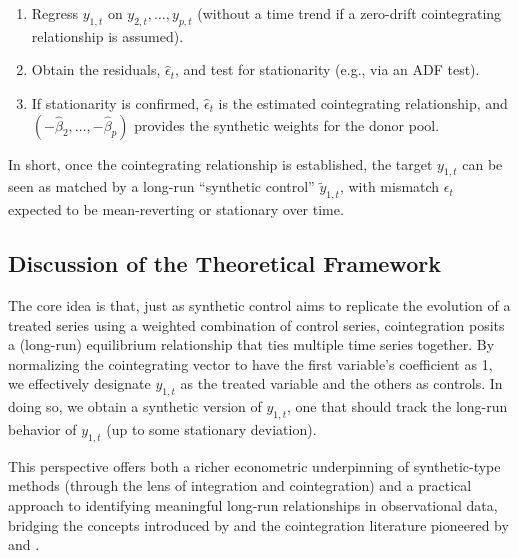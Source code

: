 \begin{enumerate}
    \item Regress $y_{1,t}$ on $y_{2,t}, \dots, y_{p,t}$ (without a time trend if a zero-drift cointegrating relationship is assumed).
    \item Obtain the residuals, $\widehat{\epsilon}_t$, and test for stationarity (e.g., via an ADF test).
    \item If stationarity is confirmed, $\widehat{\epsilon}_t$ is the estimated cointegrating relationship, and $(-\widehat{\beta}_2, \dots, -\widehat{\beta}_p)$ provides the synthetic weights for the donor pool.
\end{enumerate}

In short, once the cointegrating relationship is established, the target $y_{1,t}$ can be seen as matched by a long-run ``synthetic control'' $\widetilde{y}_{1,t}$, with mismatch $\epsilon_t$ expected to be mean-reverting or stationary over time.


\subsection{Discussion of the Theoretical Framework}

The core idea is that, just as synthetic control aims to replicate the evolution of a treated series using a weighted combination of control series, cointegration posits a (long-run) equilibrium relationship that ties multiple time series together. By normalizing the cointegrating vector to have the first variable's coefficient as 1, we effectively designate $y_{1,t}$ as the treated variable and the others as controls. In doing so, we obtain a synthetic version of $y_{1,t}$, one that should track the long-run behavior of $y_{1,t}$ (up to some stationary deviation).

This perspective offers both a richer econometric underpinning of synthetic-type methods (through the lens of integration and cointegration) and a practical approach to identifying meaningful long-run relationships in observational data, bridging the concepts introduced by \cite{Abadie2003} and the cointegration literature pioneered by \cite{Engle1987} and \cite{Johansen1988}.
